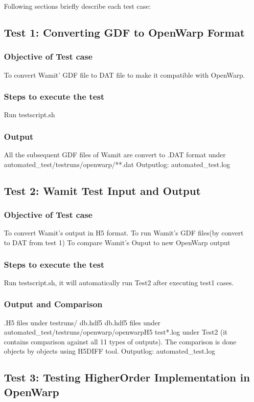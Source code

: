 \documentclass[12pt]{article}
\begin{document}
Following sections briefly describe each test case:
\subsection{Test 1: Converting GDF to OpenWarp Format}
\subsubsection{Objective of Test case}
To convert Wamit' GDF file to DAT file to make it compatible with OpenWarp.
\subsubsection{Steps to execute the test}
Run testscript.sh
\subsubsection{Output}
All the subsequent GDF files of Wamit are convert to .DAT format under automated_test/testruns/openwarp/**.dat
Outputlog: automated_test.log

\subsection{Test 2: Wamit Test Input and Output} 
\subsubsection{Objective of Test case}
To convert Wamit's output in H5 format.
To run Wamit's GDF files(by convert to DAT from test 1)
To compare Wamit's Ouput to new OpenWarp output
\subsubsection{Steps to execute the test}
Run testscript.sh, it will automatically run Test2 after executing test1 cases.
\subsubsection{Output and Comparison}
.H5 files under testruns/ db.hdf5 
db.hdf5 files under automated_test/testruns/openwarp/openwarpH5
test*.log under Test2 (it contains comparison against all 11 types of outputs). The comparison is done objects by objects using H5DIFF tool.
Outputlog: automated_test.log


\subsection{Test 3: Testing HigherOrder Implementation in OpenWarp}
\end{document}

